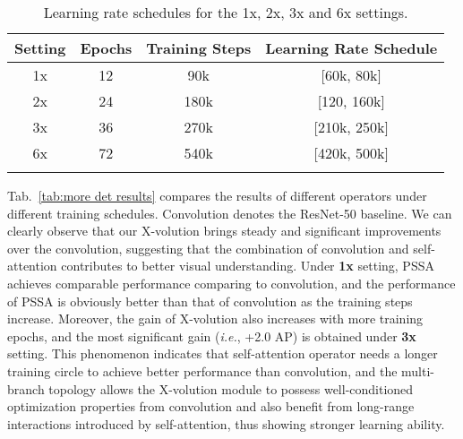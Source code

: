 \documentclass{article}
\begin{document}
\begin{table*}[!htb]\centering
 \caption{Learning rate schedules for the 1x, 2x, 3x and 6x settings.}
 \label{tab:lr schedule}
 \begin{spacing}{1.1}
 \small
 \setlength\tabcolsep{3pt}
 \begin{tabular}{c|c|c|c}
        \Xhline{1.0pt}
        Setting
        & Epochs
        & Training Steps 
        & Learning Rate Schedule \\ \hline

		1x & 12 & 90k & [60k,\; 80k]\\
		2x & 24 & 180k & [120,\; 160k]\\
		3x & 36 & 270k & [210k,\; 250k]\\
		6x & 72 & 540k & [420k,\; 500k]\\
		\Xhline{1.0pt}
\end{tabular}
\vspace{-1mm}
\end{spacing}
\end{table*}

Tab.~\ref{tab:more det results} compares the results of different operators under different training schedules. Convolution denotes the ResNet-50 baseline. We can clearly observe that our X-volution brings steady and significant improvements over the convolution, suggesting that the combination of convolution and self-attention contributes to better visual understanding. Under \textbf{1x} setting, PSSA achieves comparable performance comparing to convolution, and the performance of PSSA is obviously better than that of convolution as the training steps increase. Moreover, the gain of X-volution also increases with more training epochs, and the most significant gain (\emph{i.e.}, +2.0 AP) is obtained under \textbf{3x} setting. This phenomenon indicates that self-attention operator needs a longer training circle to achieve better performance than convolution, and the multi-branch topology allows the X-volution module to possess well-conditioned optimization properties from convolution and also benefit from long-range interactions introduced by self-attention, thus showing stronger learning ability.



\end{document}
